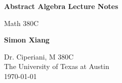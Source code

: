 \documentclass{article}
\begin{document}
\begin{titlepage}
    \begin{center}
        \vspace*{1cm}
 
        \Huge
        \textbf{Abstract Algebra Lecture Notes}
 
        \vspace{0.5cm}
        \LARGE
        Math 380C       

        \vspace{1.5cm}
 
        \textbf{Simon Xiang}
 
        \vfill
  
        \vspace{0.8cm}
 
        \Large
    	Dr. Ciperiani, M 380C\\
        The University of Texas at Austin\\
        \today
 
    \end{center}
\end{titlepage}
    
\end{document}

